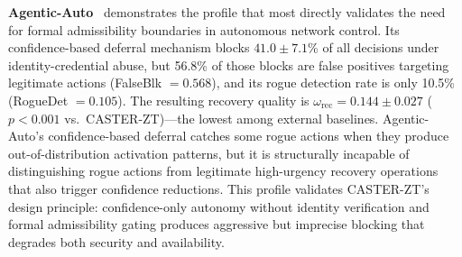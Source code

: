 \documentclass[10pt,journal,compsoc]{IEEEtran}
\begin{document}
\noindent\textbf{Agentic-Auto}~\cite{toward_autonomous_oran_2026} demonstrates the profile that most directly validates the need for formal admissibility boundaries in autonomous network control.
Its confidence-based deferral mechanism blocks $41.0\pm7.1$\% of all decisions under identity-credential abuse, but 56.8\% of those blocks are false positives targeting legitimate actions (FalseBlk $= 0.568$), and its rogue detection rate is only 10.5\% (RogueDet $= 0.105$).
The resulting recovery quality is $\omega_{\mathrm{rec}} = 0.144\pm0.027$ ($p < 0.001$ vs.\ CASTER-ZT)---the lowest among external baselines.
Agentic-Auto's confidence-based deferral catches some rogue actions when they produce out-of-distribution activation patterns, but it is structurally incapable of distinguishing rogue actions from legitimate high-urgency recovery operations that also trigger confidence reductions.
This profile validates CASTER-ZT's design principle: confidence-only autonomy without identity verification and formal admissibility gating produces aggressive but imprecise blocking that degrades both security and availability.
\end{document}
